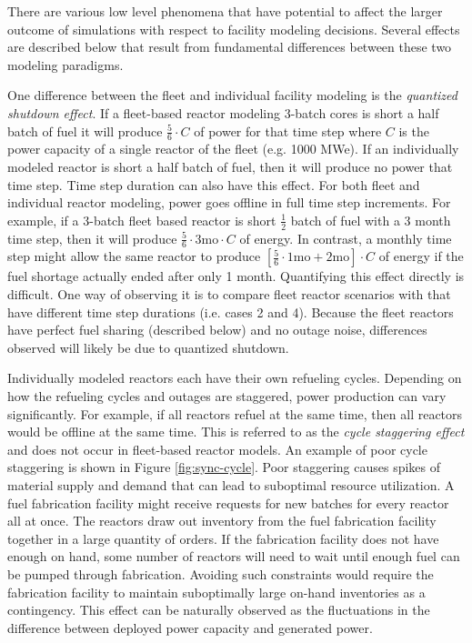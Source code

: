\documentclass{style}
\begin{document}
There are various low level phenomena that have potential to affect the larger
outcome of simulations with respect to facility modeling decisions. Several
effects are described below that result from fundamental differences between
these two modeling paradigms.

One difference between the fleet and individual facility modeling is the
\emph{quantized shutdown effect}.  If a fleet-based reactor modeling 3-batch
cores is short a half batch of fuel it will produce $\frac{5}{6}\cdot C$ of
power for that time step where $C$ is the power capacity of a single reactor
of the fleet (e.g. 1000 MWe).  If an individually modeled reactor is short a
half batch of fuel, then it will produce no power that time step.  Time step
duration can also have this effect.  For both fleet and individual reactor
modeling, power goes offline in full time step increments.  For example, if a
3-batch fleet based reactor is short $\frac{1}{2}$ batch of fuel with a 3
month time step, then it will produce $\frac{5}{6} \cdot 3 \text{mo} \cdot C $
of energy.  In contrast, a monthly time step might allow the same reactor to
produce $[\frac{5}{6} \cdot 1 \text{mo} + 2 \text{mo}] \cdot C $ of energy if
the fuel shortage actually ended after only 1 month.  Quantifying this effect
directly is difficult.  One way of observing it is to compare fleet reactor
scenarios with that have different time step durations (i.e. cases 2 and 4).
Because the fleet reactors have perfect fuel sharing (described below) and no
outage noise, differences observed will likely be due to quantized shutdown.

Individually modeled reactors each have their own refueling cycles.  Depending
on how the refueling cycles and outages are staggered, power production can
vary significantly.  For example, if all reactors refuel at the same time,
then all reactors would be offline at the same time.  This is referred to as
the \emph{cycle staggering effect} and does not occur in fleet-based reactor
models.  An example of poor cycle staggering is shown in Figure
\ref{fig:sync-cycle}.  Poor staggering causes spikes of material supply and
demand that can lead to suboptimal resource utilization.  A fuel fabrication
facility might receive requests for new batches for every reactor all at once.
The reactors draw out inventory from the fuel fabrication facility together in
a large quantity of orders.  If the fabrication facility does not have enough
on hand, some number of reactors will need to wait until enough fuel can be
pumped through fabrication.  Avoiding such constraints would require the
fabrication facility to maintain suboptimally large on-hand inventories as a
contingency.  This effect can be naturally observed as the fluctuations in the
difference between deployed power capacity and generated power.
\end{document}
